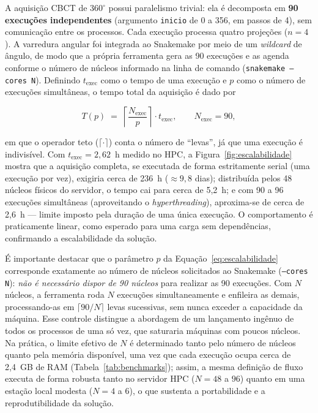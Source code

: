 A aquisição CBCT de $360^\circ$ possui paralelismo trivial: ela é decomposta em
\textbf{90 execuções independentes} (argumento \texttt{inicio} de 0 a 356, em
passos de 4), sem comunicação entre os processos. Cada execução processa quatro
projeções ($n=4$). A varredura angular foi integrada ao Snakemake por meio de um
\textit{wildcard} de ângulo, de modo que a própria ferramenta gera as 90
execuções e as agenda conforme o número de núcleos informado na linha de comando
(\texttt{snakemake --cores N}). Definindo $t_{\text{exec}}$ como o tempo de uma
execução e $p$ como o número de execuções simultâneas, o tempo total da aquisição
é dado por

\begin{equation}
T(p) \;=\; \left\lceil \frac{N_{\text{exec}}}{p} \right\rceil \cdot t_{\text{exec}},
\qquad N_{\text{exec}} = 90,
\label{eq:escalabilidade}
\end{equation}

\noindent
em que o operador teto ($\lceil\cdot\rceil$) conta o número de ``levas'', já que
uma execução é indivisível. Com $t_{\text{exec}} = 2{,}62$~h medido no HPC, a
Figura~\ref{fig:escalabilidade} mostra que a aquisição completa, se executada de
forma estritamente serial (uma execução por vez), exigiria cerca de 236~h
($\approx 9{,}8$ dias); distribuída pelos 48 núcleos físicos do servidor, o tempo
cai para cerca de 5,2~h; e com 90 a 96 execuções simultâneas (aproveitando o
\textit{hyperthreading}), aproxima-se de cerca de 2,6~h --- limite imposto pela
duração de uma única execução. O comportamento
é praticamente linear, como esperado para uma carga sem dependências,
confirmando a escalabilidade da solução.

É importante destacar que o parâmetro $p$ da Equação~\ref{eq:escalabilidade}
corresponde exatamente ao número de núcleos solicitados ao Snakemake
(\texttt{--cores N}): \emph{não é necessário dispor de 90 núcleos} para realizar
as 90 execuções. Com $N$ núcleos, a ferramenta roda $N$ execuções
simultaneamente e enfileira as demais, processando-as em $\lceil 90/N \rceil$
levas sucessivas, sem nunca exceder a capacidade da máquina. Esse controle
distingue a abordagem de um lançamento ingênuo de todos os processos de uma só
vez, que saturaria máquinas com poucos núcleos. Na prática, o limite efetivo de
$N$ é determinado tanto pelo número de núcleos quanto pela memória disponível,
uma vez que cada execução ocupa cerca de 2,4~GB de RAM
(Tabela~\ref{tab:benchmarks}); assim, a mesma definição de fluxo executa de forma
robusta tanto no servidor HPC ($N = 48$ a $96$) quanto em uma estação local
modesta ($N = 4$ a $6$), o que sustenta a portabilidade e a reprodutibilidade da
solução.

